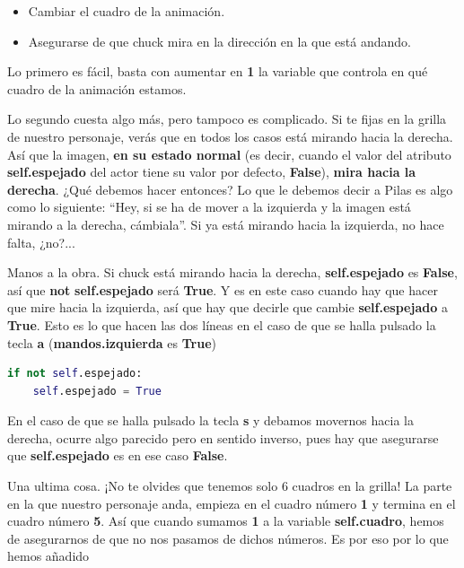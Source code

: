 \documentclass{article}
\begin{document}
\begin{itemize}
\item Cambiar el cuadro de la animación.
\item Asegurarse de que chuck mira en la dirección en la que está andando.
\end{itemize}
Lo primero es fácil, basta con aumentar en \textbf{1} la variable que controla en qué cuadro de la animación estamos.\par
Lo segundo cuesta algo más, pero tampoco es complicado. Si te fijas en la grilla de nuestro personaje, verás que en todos los casos está mirando hacia la derecha. Así que la imagen, \textbf{en su estado normal}  (es decir, cuando el valor del atributo \textbf{self.espejado} del actor tiene su valor por defecto, \textcolor{codepurple}{\textbf{False}}), \textbf{mira hacia la derecha}. ¿Qué debemos hacer entonces? Lo que le debemos decir a Pilas es algo como lo siguiente: “Hey, si se ha de mover a la izquierda y la imagen está mirando a la derecha, cámbiala”. Si ya está mirando hacia la izquierda, no hace falta, ¿no?...\par
Manos a la obra. Si chuck está mirando hacia la derecha, \textbf{self.espejado} es \textcolor{codepurple}{\textbf{False}}, así que \textcolor{codepurple}{\textbf{not}} \textbf{self.espejado} será \textcolor{codepurple}{\textbf{True}}. Y es en este caso cuando hay que hacer que mire hacia la izquierda, así que hay que decirle que cambie \textbf{self.espejado} a \textcolor{codepurple}{\textbf{True}}. Esto es lo que hacen las dos líneas en el caso de que se halla pulsado la tecla \textbf{a} (\textbf{mandos.izquierda} es \textcolor{codepurple}{\textbf{True}})\par

\begin{lstlisting}[language=Python]
if not self.espejado:
    self.espejado = True
\end{lstlisting}
\vspace{\baselineskip}

En el caso de que se halla pulsado la tecla \textbf{s} y debamos movernos hacia la derecha, ocurre algo parecido pero en sentido inverso, pues hay que asegurarse que \textbf{self.espejado} es en ese caso \textcolor{codepurple}{\textbf{False}}.\par
Una ultima cosa. ¡No te olvides que tenemos solo 6 cuadros en la grilla! La parte en la que nuestro personaje anda, empieza en el cuadro número \textbf{1} y termina en el cuadro número \textbf{5}. Así que cuando sumamos \textbf{1} a la variable \textbf{self.cuadro}, hemos de asegurarnos de que no nos pasamos de dichos números. Es por eso por lo que hemos añadido\par
\end{document}
